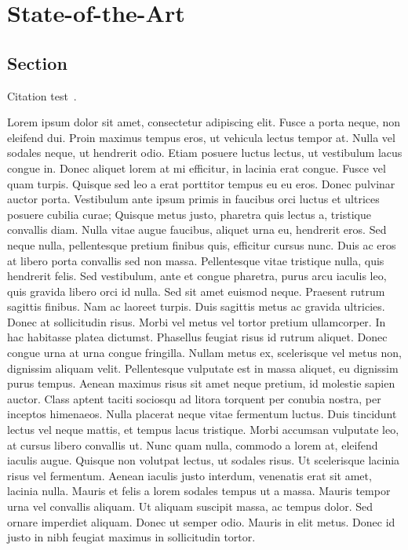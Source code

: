 
\chapter{State-of-the-Art}\label{chapter:state-of-the-art}

\section{Section}
Citation test~\parencite{latex}.

Lorem ipsum dolor sit amet, consectetur adipiscing elit. Fusce a porta neque, non eleifend dui. Proin maximus tempus eros, ut vehicula lectus tempor at. Nulla vel sodales neque, ut hendrerit odio. Etiam posuere luctus lectus, ut vestibulum lacus congue in. Donec aliquet lorem at mi efficitur, in lacinia erat congue. Fusce vel quam turpis. Quisque sed leo a erat porttitor tempus eu eu eros. Donec pulvinar auctor porta. Vestibulum ante ipsum primis in faucibus orci luctus et ultrices posuere cubilia curae;
Quisque metus justo, pharetra quis lectus a, tristique convallis diam. Nulla vitae augue faucibus, aliquet urna eu, hendrerit eros. Sed neque nulla, pellentesque pretium finibus quis, efficitur cursus nunc. Duis ac eros at libero porta convallis sed non massa. Pellentesque vitae tristique nulla, quis hendrerit felis. Sed vestibulum, ante et congue pharetra, purus arcu iaculis leo, quis gravida libero orci id nulla. Sed sit amet euismod neque. Praesent rutrum sagittis finibus. Nam ac laoreet turpis. Duis sagittis metus ac gravida ultricies. Donec at sollicitudin risus. Morbi vel metus vel tortor pretium ullamcorper. In hac habitasse platea dictumst. Phasellus feugiat risus id rutrum aliquet. Donec congue urna at urna congue fringilla. Nullam metus ex, scelerisque vel metus non, dignissim aliquam velit.
Pellentesque vulputate est in massa aliquet, eu dignissim purus tempus. Aenean maximus risus sit amet neque pretium, id molestie sapien auctor. Class aptent taciti sociosqu ad litora torquent per conubia nostra, per inceptos himenaeos. Nulla placerat neque vitae fermentum luctus. Duis tincidunt lectus vel neque mattis, et tempus lacus tristique. Morbi accumsan vulputate leo, at cursus libero convallis ut. Nunc quam nulla, commodo a lorem at, eleifend iaculis augue. Quisque non volutpat lectus, ut sodales risus. Ut scelerisque lacinia risus vel fermentum.
Aenean iaculis justo interdum, venenatis erat sit amet, lacinia nulla. Mauris et felis a lorem sodales tempus ut a massa. Mauris tempor urna vel convallis aliquam. Ut aliquam suscipit massa, ac tempus dolor. Sed ornare imperdiet aliquam. Donec ut semper odio. Mauris in elit metus. Donec id justo in nibh feugiat maximus in sollicitudin tortor.
